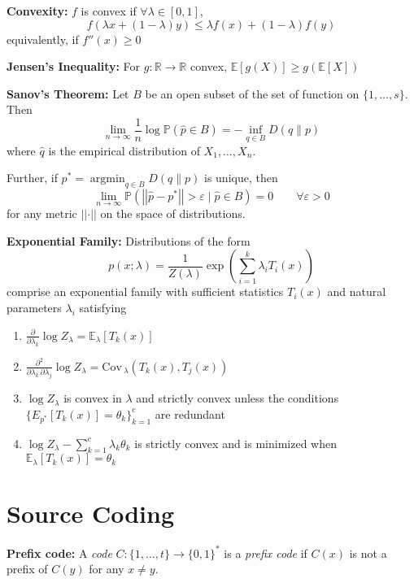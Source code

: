 \documentclass[8pt]{extarticle}
\renewcommand{\hat}[1]{\widehat{#1}}
\renewcommand{\P}{\mathbb{P}}
\newcommand{\R}{\mathbb{R}}
\newcommand{\E}{\mathbb{E}}
\newcommand{\norm}[1]{\left\vert\left\vert #1 \right\vert\right\vert}
\newcommand{\ep}{\varepsilon}
\newcommand{\Cov}{\text{Cov}\,}
\DeclareMathOperator*{\argmin}{\arg\min}
\newcommand*{\tbf}[1]{\ifmmode\mathbf{#1}\else\textbf{#1}\fi}
\newenvironment*{proposition}[1][gray]{
    \begin{tcolorbox}[
        parbox=false,
        colback=#1!5!white,
        colframe=#1!75!black,
        breakable,
        left=2pt, right=2pt
    ]}
    {\end{tcolorbox}}
\begin{document}
\begin{multicols}{3}
    \tbf{Convexity:} $f$ is convex if $\forall \lambda \in [0, 1]$,
    \[f(\lambda x + (1- \lambda)y) \leq \lambda f(x) + (1 - \lambda)f(y)\]
    equivalently, if $f''(x) \geq 0$

    \begin{proposition}
        \textbf{Jensen's Inequality:} For $g: \R \to \R$ convex, $\E[g(X)] \geq g(\E[X])$
    \end{proposition}

    \begin{proposition}
        \textbf{Sanov's Theorem:} Let $B$ be an open subset of the set of function on $\{1, \dots, s\}$. Then
        \[\lim_{n \to \infty} \frac{1}{n} \log \P(\hat p\in B) = -\inf_{q \in B} D(q \parallel p)\]
        where $\hat q$ is the empirical distribution of $X_1, \dots, X_n$.

        Further, if $p^* = \argmin_{q \in B} D(q \parallel p)$ is unique, then
        \[\lim_{n \to \infty} \P(\norm{\hat p - p^*}> \ep \; | \; \hat p \in B) = 0 \qquad \forall \ep > 0\]
        for any metric $\norm{\cdot}$ on the space of distributions.
    \end{proposition}

    \begin{proposition}
        \textbf{Exponential Family:} Distributions of the form
        \[p(x; \lambda) = \frac{1}{Z(\lambda)} \exp\left(\sum_{i=1}^k \lambda_i T_i(x)\right)\]
        comprise an exponential family with sufficient statistics $T_i(x)$ and natural parameters $\lambda_i$ satisfying
        \begin{enumerate}
            \item $\frac{\partial }{\partial \lambda_k} \log Z_{\lambda} = \E_{\lambda}[T_k(x)]$
            \item $\frac{\partial^2}{\partial \lambda_k \, \partial \lambda_j} \log Z_{\lambda} = \Cov_{\lambda}(T_k(x), T_j(x))$
            \item $\log Z_{\lambda}$ is convex in $\lambda$ and strictly convex unless the conditions $\{E_{p^*}[T_k(x)] = \theta_k\}_{k=1}^c$ are redundant
            \item $\log Z_{\lambda} -\sum_{k=1}^c \lambda_k \theta_k$ is strictly convex and is minimized when $\E_{\lambda}[T_k(x)] = \theta_k$
        \end{enumerate}
    \end{proposition}

    \section*{Source Coding}
    \tbf{Prefix code:} A \emph{code} $C: \{1, \dots, t\} \to \{0, 1\}^*$ is a \emph{prefix code} if $C(x)$ is not a prefix of $C(y)$ for any $x \neq y$.


\end{multicols}
\end{document}
